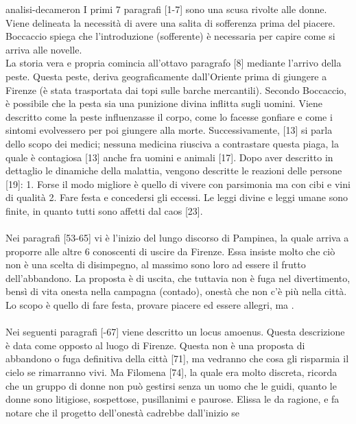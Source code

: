 \documentclass[preview]{standalone}
\begin{document}
\begin{snippet}{analisi-decameron}
    I primi 7 paragrafi [1-7] sono una scusa rivolte alle donne. Viene delineata la necessità di 
    avere una salita di sofferenza prima del piacere.
    Boccaccio spiega che l'introduzione (sofferente) è necessaria per capire come si arriva alle novelle. \\
    La storia vera e propria comincia all'ottavo paragrafo [8] mediante l'arrivo della peste.
    Questa peste, deriva geograficamente dall'Oriente prima di giungere a Firenze
    (è stata trasportata dai topi sulle barche mercantili).
    Secondo Boccaccio, è possibile che la pesta sia una punizione divina inflitta sugli uomini.
    Viene descritto come la peste influenzasse il corpo, come lo facesse gonfiare e come i sintomi evolvessero per poi giungere alla morte.
    Successivamente, [13] si parla dello scopo dei medici; nessuna medicina riusciva a contrastare questa piaga, la quale è contagiosa [13]
    anche fra uomini e animali [17].
    Dopo aver descritto in dettaglio le dinamiche della malattia, vengono descritte
    le reazioni delle persone [19]: 1. Forse il modo migliore è quello di vivere con parsimonia ma con cibi e vini di qualità
    2. Fare festa e concedersi gli eccessi.
    Le leggi divine e leggi umane sono finite, in quanto tutti sono affetti dal caos [23].
    \\\\
    Nei paragrafi [53-65] vi è l'inizio del lungo discorso di Pampinea, la quale arriva a proporre alle altre 6 conoscenti
    di uscire da Firenze. Essa insiste molto che ciò non è una scelta di disimpegno,
    al massimo sono loro ad essere il frutto dell'abbandono.
    La proposta è di uscita, che tuttavia non è fuga nel divertimento, bensì di vita onesta nella campagna (contado),
    onestà che non c'è più nella città. Lo scopo è quello di fare festa, provare piacere ed essere allegri,
    ma .
    \\\\
    Nei seguenti paragrafi [-67] viene descritto un locus amoenus.
    Questa descrizione è data come opposto al luogo di Firenze.
    Questa non è una proposta di abbandono o fuga definitiva della città [71],
    ma vedranno che cosa gli risparmia il cielo se rimarranno vivi.
    Ma Filomena [74], la quale era molto discreta, ricorda che un gruppo di donne non può gestirsi
    senza un uomo che le guidi, quanto le donne sono litigiose, sospettose, pusillanimi e paurose.
    Elissa le da ragione, e fa notare che il progetto dell'onestà cadrebbe dall'inizio se

\end{snippet}
\end{document}
